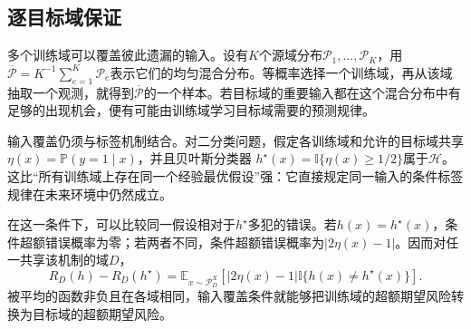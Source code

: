 \subsection{逐目标域保证}
\label{sec:dg-shared-mechanism}

多个训练域可以覆盖彼此遗漏的输入。设有$K$个源域分布$\mathcal P_1,\ldots,\mathcal P_K$，用
$\overline{\mathcal P}=K^{-1}\sum_{e=1}^K\mathcal P_e$表示它们的均匀混合分布。等概率选择一个训练域，再从该域抽取一个观测，就得到$\overline{\mathcal P}$的一个样本。若目标域的重要输入都在这个混合分布中有足够的出现机会，便有可能由训练域学习目标域需要的预测规律。

输入覆盖仍须与标签机制结合。对二分类问题，假定各训练域和允许的目标域共享
$\eta(x)=\mathbb P(y=1\mid x)$，并且贝叶斯分类器
$h^\star(x)=\mathbb I\{\eta(x)\geq1/2\}$属于$\mathcal H$。这比“所有训练域上存在同一个经验最优假设”强：它直接规定同一输入的条件标签规律在未来环境中仍然成立。

在这一条件下，可以比较同一假设相对于$h^\star$多犯的错误。若$h(x)=h^\star(x)$，条件超额错误概率为零；若两者不同，条件超额错误概率为$|2\eta(x)-1|$。因而对任一共享该机制的域$D$，
\begin{equation}
 R_D(h)-R_D(h^\star)
 =\mathbb E_{x\sim\mathcal P_D^X}
   [|2\eta(x)-1|\mathbb I\{h(x)\neq h^\star(x)\}].
 \label{eq:shared-bayes-excess}
\end{equation}
被平均的函数非负且在各域相同，输入覆盖条件就能够把训练域的超额期望风险转换为目标域的超额期望风险。


